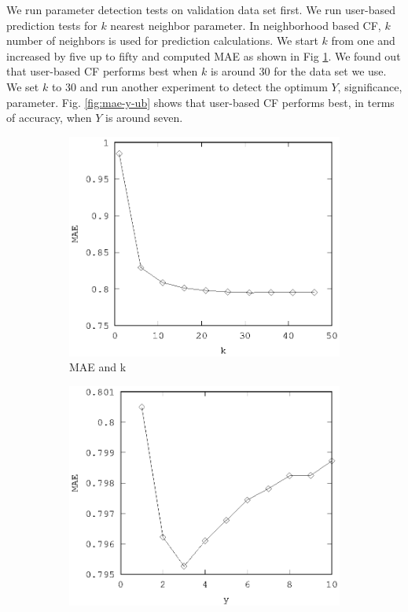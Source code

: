 \documentclass[conference]{IEEEtran}
\begin{document}
We run parameter detection tests on validation data set first. We run user-based
prediction tests for $k$ nearest neighbor parameter. In neighborhood based CF, 
$k$ number of neighbors is used for prediction calculations. We start $k$ from 
one and increased by five up to fifty and computed MAE as shown in 
Fig \ref{fig:mae-k-ub}. We found out that user-based CF performs best when $k$ 
is around 30 for the data set we use. We set $k$ to 30 and run another 
experiment to detect the optimum $Y$, significance, parameter. 
Fig. \ref{fig:mae-y-ub} shows that user-based CF performs best, in terms of 
accuracy, when $Y$ is around seven.
\begin{figure}
        \begin{subfigure}[b]{0.225\textwidth}
                \includegraphics[width=\textwidth]{charts/ub-mae-k.eps}
                \caption{MAE and k}
                \label{fig:mae-k-ub}
        \end{subfigure}
        \quad
        \begin{subfigure}[b]{0.225\textwidth}
                \includegraphics[width=\textwidth]{charts/ub-mae-y.eps}

\end{subfigure}
\end{figure}
\end{document}
